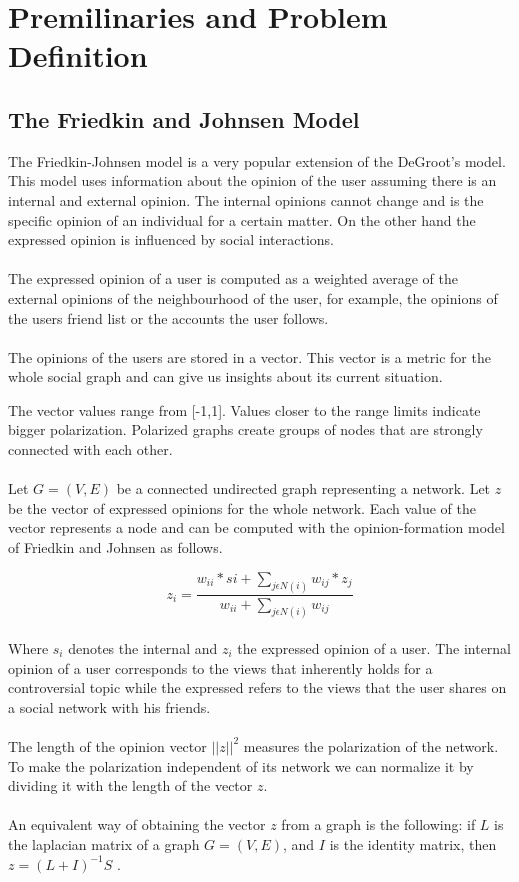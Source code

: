 \chapter{Premilinaries and Problem Definition}
\label{ch:premAndDef}


\section{The Friedkin and Johnsen Model}
\label{sec:prem}

The Friedkin-Johnsen model is a very popular extension of the DeGroot's model. This model uses information about the opinion of the user assuming there is an internal and external opinion. The internal opinions cannot change and is the specific opinion of an individual for a certain matter. On the other hand the expressed opinion is influenced by social interactions.
\\
\\
The expressed opinion of a user is computed as a weighted average of the external opinions of the neighbourhood of the user, for example, the opinions of the users friend list or the accounts the user follows.
\\
\\
The opinions of the users are stored in a vector. This vector is a metric for the whole social graph and can give us insights about its current situation. 
\clearpage


\noindent The vector values range from [-1,1]. Values closer to the range limits indicate bigger polarization. Polarized graphs create groups of nodes that are strongly connected with each other.
\\
\\
\noindent Let $G = (V,E)$ be a connected undirected graph representing a network. Let $z$ be the vector of expressed opinions  for the whole network. Each value  of the vector represents a node and can be computed with the opinion-formation model of Friedkin and Johnsen as follows. 

\begin{equation} 
	z_i = \frac{w_{ii}*si + \sum_{j \epsilon N(i) }{w_{ij}*z_j}} {w_{ii} + \sum_{j \epsilon N(i) }{w_{ij}}} 
\end{equation} 
\\

\noindent Where $s_i$ denotes the internal and $z_i$ the expressed opinion of a user. The internal opinion of a user corresponds to the views that inherently holds for a controversial topic while the expressed refers to the views that the user shares on a social network with his friends. 
\\
\\
The length of the opinion vector $||z|| ^2$ measures  the polarization of the network. To make the polarization  independent of its network we can  normalize it  by dividing  it with the length of the vector $z$. 
\\
\\
An equivalent way of obtaining the vector $z$ from a graph is the following: if $L$ is the laplacian matrix of a graph $G=(V,E)$, and $I$ is the identity matrix, then $z=(L+I)^{-1}S$ \cite{bindel}. 

